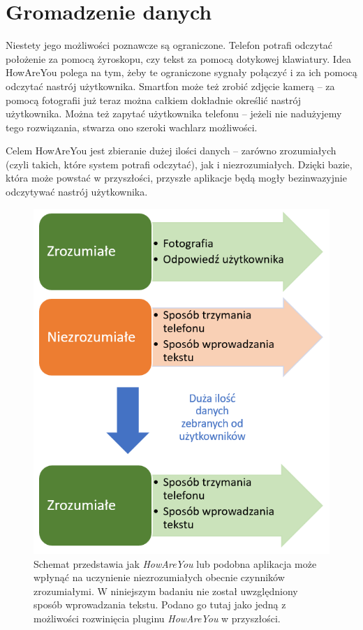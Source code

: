 \section{Gromadzenie danych}
\label{sec:gromadzenieDanych}

Niestety jego możliwości poznawcze są ograniczone. Telefon potrafi odczytać położenie za pomocą żyroskopu, czy tekst za pomocą dotykowej klawiatury. Idea HowAreYou polega na tym, żeby te ograniczone sygnały połączyć i za ich pomocą odczytać nastrój użytkownika. Smartfon może też zrobić zdjęcie kamerą – za pomocą fotografii już teraz można całkiem dokładnie określić nastrój użytkownika. Można też zapytać użytkownika telefonu – jeżeli nie nadużyjemy tego rozwiązania, stwarza ono szeroki wachlarz możliwości.

Celem HowAreYou jest zbieranie dużej ilości danych – zarówno zrozumiałych (czyli takich, które system potrafi odczytać), jak i niezrozumiałych. Dzięki bazie, która może powstać w przyszłości, przyszłe aplikacje będą mogły bezinwazyjnie odczytywać nastrój użytkownika.

\begin{figure}[H]
	\centering
	\includegraphics[scale=0.7]{rozdzial1/gromadzenieDanych.png}
	\caption{Schemat przedstawia jak \textit{HowAreYou} lub podobna aplikacja może wpłynąć na uczynienie niezrozumiałych obecnie czynników zrozumiałymi. W niniejszym badaniu nie został uwzględniony sposób wprowadzania tekstu. Podano go tutaj jako jedną z możliwości rozwinięcia pluginu \textit{HowAreYou} w przyszłości.}
\end{figure}

